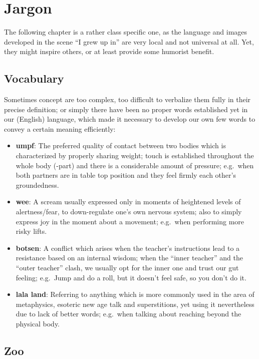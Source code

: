 \section{Jargon}\label{sec:jargon}

The following chapter is a rather class specific one, as the language and images developed in the scene ``I grew up in'' are very local and not universal at all.
Yet, they might inspire others, or at least provide some humorist benefit.

\subsection{Vocabulary}\label{subsec:vocabulary}

Sometimes concept are too complex, too difficult to verbalize them fully in their precise definition; or simply there have been no proper words established yet in our (English) language, which made it necessary to develop our own few words to convey a certain meaning efficiently:

\begin{itemize}
    \item \textbf{umpf}: The preferred quality of contact between two bodies which is characterized by properly sharing weight; touch is established throughout the whole body (-part) and there is a considerable amount of pressure; e.g.\ when both partners are in table top position and they feel firmly each other's groundedness.
    \item \textbf{wee}: A scream usually expressed only in moments of heightened levels of alertness/fear, to down-regulate one's own nervous system; also to simply express joy in the moment about a movement; e.g.\ when performing more risky lifts.
    \item \textbf{botsen}: A conflict which arises when the teacher's instructions lead to a resistance based on an internal wisdom; when the ``inner teacher'' and the ``outer teacher'' clash, we usually opt for the inner one and trust our gut feeling; e.g.\ Jump and do a roll, but it doesn't feel safe, so you don't do it.
    \item \textbf{lala land}: Referring to anything which is more commonly used in the area of metaphysics, esoteric new age talk and superstitions, yet using it nevertheless due to lack of better words; e.g.\ when talking about reaching beyond the physical body.
\end{itemize}

\subsection{Zoo}\label{subsec:zoo}

